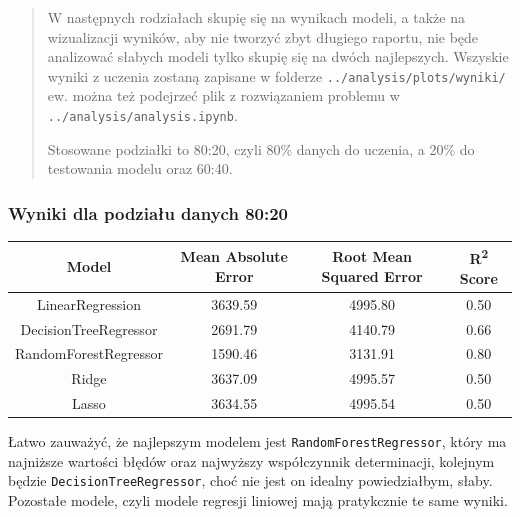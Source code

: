 \documentclass[a4paper]{article}
\begin{document}
\begin{abstract}
    \quad W następnych rodziałach skupię się na wynikach modeli, a także na wizualizacji wyników, aby nie
    tworzyć zbyt długiego raportu, nie będe analizować słabych modeli tylko skupię się na dwóch najlepszych. Wszyskie wyniki z uczenia zostaną zapisane w folderze \texttt{../analysis/plots/wyniki/} ew. można też podejrzeć plik z rozwiązaniem problemu w \texttt{../analysis/analysis.ipynb}.

    \quad Stosowane podziałki to 80:20, czyli 80\% danych do uczenia, a 20\% do testowania modelu oraz 60:40.
\end{abstract}

\subsubsection{Wyniki dla podziału danych 80:20}

\begin{table}[H]
    \centering
    \begin{tabular}{|c|c|c|c|}
        \hline
        \textbf{Model}        & \textbf{Mean Absolute Error} & \textbf{Root Mean Squared Error} & \textbf{R\textsuperscript{2} Score} \\ \hline
        LinearRegression      & 3639.59                      & 4995.80                          & 0.50                                \\ \hline
        DecisionTreeRegressor & 2691.79                      & 4140.79                          & 0.66                                \\ \hline
        RandomForestRegressor & 1590.46                      & 3131.91                          & 0.80                                \\ \hline
        Ridge                 & 3637.09                      & 4995.57                          & 0.50                                \\ \hline
        Lasso                 & 3634.55                      & 4995.54                          & 0.50                                \\ \hline
    \end{tabular}
\end{table}


\quad Łatwo zauważyć, że najlepszym modelem jest \texttt{RandomForestRegressor}, który ma
najniższe wartości błędów oraz najwyższy współczynnik determinacji, kolejnym
będzie \texttt{DecisionTreeRegressor}, choć nie jest on idealny powiedziałbym, słaby.
Pozostałe modele, czyli modele regresji liniowej mają pratykcznie te same wyniki.
\end{document}
